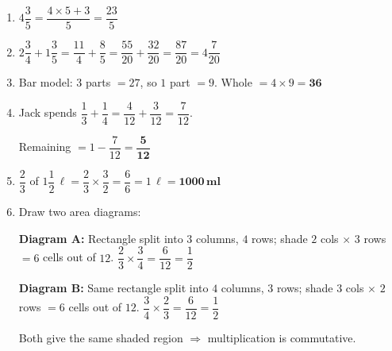 \documentclass{beamer}
\begin{document}
\begin{frame}

\small
\begin{enumerate}


  \item $4\dfrac{3}{5} = \dfrac{4\times 5 + 3}{5} = \dfrac{23}{5}$

  \item $2\dfrac{3}{4} + 1\dfrac{3}{5} = \dfrac{11}{4}+\dfrac{8}{5} = \dfrac{55}{20}+\dfrac{32}{20} = \dfrac{87}{20} = 4\dfrac{7}{20}$

  \item Bar model: $3$ parts $= 27$, so $1$ part $= 9$.
  Whole $= 4 \times 9 = \mathbf{36}$

  \item Jack spends $\dfrac{1}{3}+\dfrac{1}{4} = \dfrac{4}{12}+\dfrac{3}{12} = \dfrac{7}{12}$.

  Remaining $= 1 - \dfrac{7}{12} = \mathbf{\dfrac{5}{12}}$

  \item $\dfrac{2}{3}$ of $1\dfrac{1}{2}\,\ell = \dfrac{2}{3}\times\dfrac{3}{2} = \dfrac{6}{6} = 1\,\ell = \mathbf{1000\,\text{ml}}$

  \item Draw two area diagrams:

  \quad \textbf{Diagram A:} Rectangle split into $3$ columns, $4$ rows; shade $2$ cols $\times$ $3$ rows $=6$ cells out of $12$.
  $\dfrac{2}{3}\times\dfrac{3}{4} = \dfrac{6}{12}=\dfrac{1}{2}$

  \quad \textbf{Diagram B:} Same rectangle split into $4$ columns, $3$ rows; shade $3$ cols $\times$ $2$ rows $=6$ cells out of $12$.
  $\dfrac{3}{4}\times\dfrac{2}{3} = \dfrac{6}{12}=\dfrac{1}{2}$

  Both give the same shaded region $\Rightarrow$ multiplication is commutative. \checkmark

\end{enumerate}
\end{frame}
\end{document}
